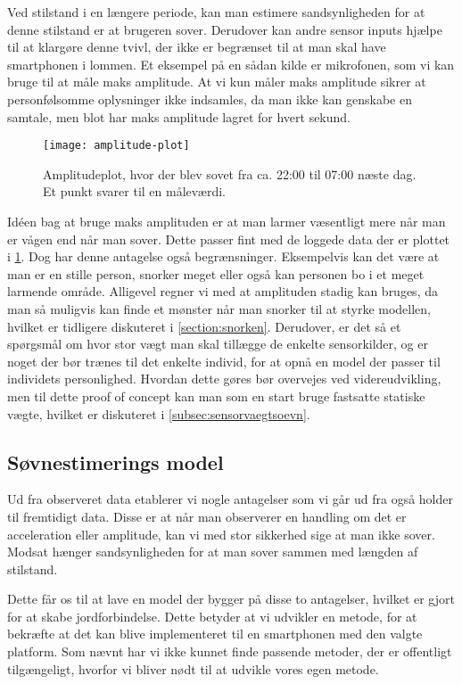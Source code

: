 Ved stilstand i en længere periode, kan man estimere sandsynligheden for at denne stilstand er at brugeren sover. 
Derudover kan andre sensor inputs hjælpe til at klargøre denne tvivl, der ikke er begrænset til at man skal have smartphonen i lommen.
Et eksempel på en sådan kilde er mikrofonen, som vi kan bruge til at måle maks amplitude.
At vi kun måler maks amplitude sikrer at personfølsomme oplysninger ikke indsamles, da man ikke kan genskabe en samtale, men blot har maks amplitude lagret for hvert sekund.

\begin{figure}[h]
	\centering
	\texttt{[image: amplitude-plot]}
	\caption{Amplitudeplot, hvor der blev sovet fra ca. 22:00 til 07:00 næste dag. Et punkt svarer til en måleværdi.}\label{fig:amplplot}
\end{figure}

Idéen bag at bruge maks amplituden er at man larmer væsentligt mere når man er vågen end når man sover.
Dette passer fint med de loggede data der er plottet i \cref{fig:amplplot}.
Dog har denne antagelse også begrænsninger.
Eksempelvis kan det være at man er en stille person, snorker meget eller også kan personen bo i et meget larmende område.
Alligevel regner vi med at amplituden stadig kan bruges, da man så muligvis kan finde et mønster når man snorker til at styrke modellen, hvilket er tidligere diskuteret i \cref{section:snorken}.
Derudover, er det så et spørgsmål om hvor stor vægt man skal tillægge de enkelte sensorkilder, og er noget der bør trænes til det enkelte individ, for at opnå en model der passer til individets personlighed.
Hvordan dette gøres bør overvejes ved videreudvikling, men til dette proof of concept kan man som en start bruge fastsatte statiske vægte, hvilket er diskuteret i \cref{subsec:sensorvaegtsoevn}.

\subsection{Søvnestimerings model}
Ud fra observeret data etablerer vi nogle antagelser som vi går ud fra også holder til fremtidigt data.
Disse er at når man observerer en handling om det er acceleration eller amplitude, kan vi med stor sikkerhed sige at man ikke sover.
Modsat hænger sandsynligheden for at man sover sammen med længden af stilstand.

Dette får os til at lave en model der bygger på disse to antagelser, hvilket er gjort for at skabe jordforbindelse.
Dette betyder at vi udvikler en metode, for at bekræfte at det kan blive implementeret til en smartphonen med den valgte platform.
Som nævnt har vi ikke kunnet finde passende metoder, der er offentligt tilgængeligt, hvorfor vi bliver nødt til at udvikle vores egen metode.

